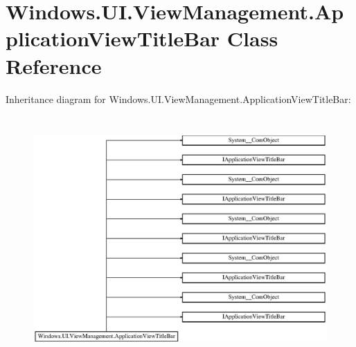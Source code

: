 \hypertarget{class_windows_1_1_u_i_1_1_view_management_1_1_application_view_title_bar}{}\section{Windows.\+U\+I.\+View\+Management.\+Application\+View\+Title\+Bar Class Reference}
\label{class_windows_1_1_u_i_1_1_view_management_1_1_application_view_title_bar}
Inheritance diagram for Windows.\+U\+I.\+View\+Management.\+Application\+View\+Title\+Bar\+:\begin{figure}[H]
\begin{center}
\leavevmode
\includegraphics[height=9.418961cm]{class_windows_1_1_u_i_1_1_view_management_1_1_application_view_title_bar}
\end{center}
\end{figure}
